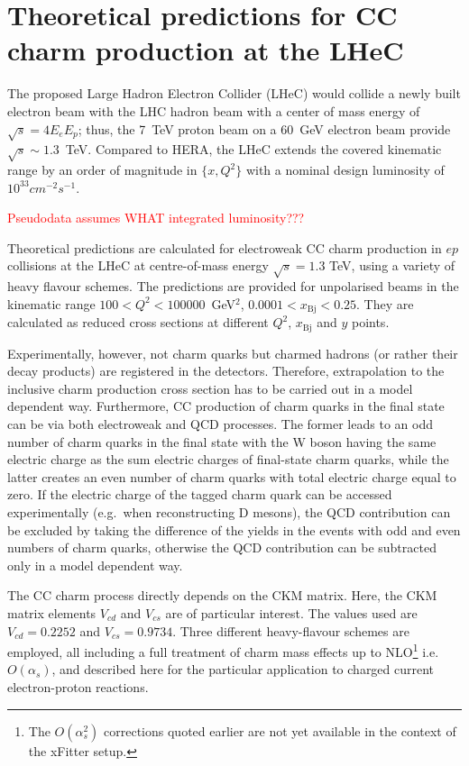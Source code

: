 \documentclass[pdftex,twocolumn,epjc3]{svjour3}          %
\newcommand{\xbj}{\ensuremath{x_{\text{Bj}}}\xspace}
\begin{document}
\section{Theoretical predictions for CC charm production at the LHeC} \label{sec:thpred}


The proposed Large Hadron Electron Collider (LHeC) would collide a newly built electron beam
with the LHC hadron beam with a center of mass energy of  $\sqrt{s} = 4 E_e E_p$;
thus, the 7~TeV proton beam on a 60~GeV electron beam  provide $\sqrt{s}\sim 1.3$~TeV.
%
Compared to  HERA, the LHeC extends the covered kinematic range by an order of magnitude in $\{x,Q^2 \}$
with a nominal design luminosity of $10^{33} cm^{-2} s^{-1}$.

\textcolor{red}{Pseudodata assumes WHAT integrated luminosity???}

Theoretical predictions are calculated for electroweak CC charm
production in $ep$ collisions at the LHeC at centre-of-mass energy
$\sqrt{s} = 1.3$ TeV, using a variety of heavy flavour schemes. The
predictions are provided for unpolarised beams in the kinematic range
$100 < Q^2 < 100000$~GeV$^2$, $0.0001 < \xbj < 0.25$. They are
calculated as reduced cross sections at different $Q^2$, \xbj and $y$
points.


Experimentally, however, not charm quarks but charmed
hadrons (or rather their decay products) are registered in the
detectors.  Therefore, extrapolation to the inclusive charm
production cross section has to be carried out in a model dependent
way.  Furthermore, CC production of charm quarks in the final state
can be via both electroweak and QCD processes.  The former leads to
an odd number of charm quarks in the final state with the W boson
having the same electric charge as the sum electric charges of
final-state charm quarks, while the latter creates an even number of
charm quarks with total electric charge equal to zero.  If the
electric charge of the tagged charm quark can be accessed
experimentally (e.g.~when reconstructing D mesons), the QCD
contribution can be excluded by taking the difference of the yields
in the events with odd and even numbers of charm quarks, otherwise
the QCD contribution can be subtracted only in a model dependent
way.  

The CC charm process directly depends on the CKM matrix. Here, the CKM matrix 
elements $V_{cd}$ and $V_{cs}$ are of particular interest. The values used are 
$V_{cd} = 0.2252$ and $V_{cs} = 0.9734$.
Three different heavy-flavour schemes are employed, all including a full 
treatment of charm mass effects up to
NLO\footnote{The $O(\alpha_s^2)$ 
corrections quoted earlier are not yet available in the context of the xFitter 
setup.}\llap{,}
i.e.~$O(\alpha_s)$, and described here for the particular application 
to charged current electron-proton reactions.
\end{document}
